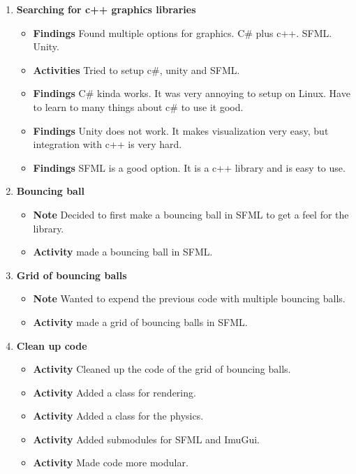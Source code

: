 \documentclass{article}
\begin{document}
\begin{enumerate}
    \item \textbf{Searching for c++ graphics libraries}
          \begin{itemize}
              \item \textbf{Findings} Found multiple options for graphics. C\# plus c++. SFML. Unity.
              \item \textbf{Activities} Tried to setup c\#, unity and SFML.
              \item \textbf{Findings} C\# kinda works. It was very annoying to setup on Linux. Have to learn to many things about c\# to use it good.
              \item \textbf{Findings} Unity does not work. It makes visualization very easy, but integration with c++ is very hard.
              \item \textbf{Findings} SFML is a good option. It is a c++ library and is easy to use.
          \end{itemize}

    \item \textbf{Bouncing ball}
          \begin{itemize}
              \item \textbf{Note} Decided to first make a bouncing ball in SFML to get a feel for the library.
              \item \textbf{Activity} made a bouncing ball in SFML.
          \end{itemize}

    \item \textbf{Grid of bouncing balls}
          \begin{itemize}
              \item \textbf{Note} Wanted to expend the previous code with multiple bouncing balls.
              \item \textbf{Activity} made a grid of bouncing balls in SFML.
          \end{itemize}

    \item \textbf{Clean up code}
          \begin{itemize}
              \item \textbf{Activity} Cleaned up the code of the grid of bouncing balls.
              \item \textbf{Activity} Added a class for rendering.
              \item \textbf{Activity} Added a class for the physics.
              \item \textbf{Activity} Added submodules for SFML and ImuGui.
              \item \textbf{Activity} Made code more modular.
          \end{itemize}


\end{enumerate}
\end{document}
